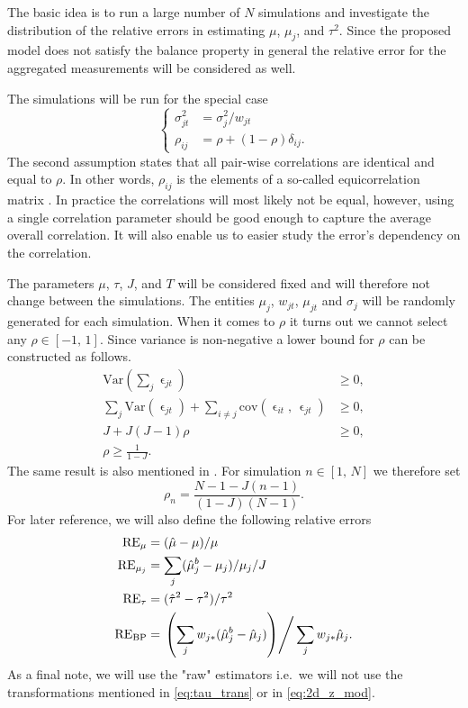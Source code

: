 \documentclass[11pt]{article}
\theoremstyle{definition}
\begin{document}
The basic idea is to run a large number of $N$ simulations and investigate the distribution of the relative errors in estimating $\mu$, $\mu_j$, and $\tau^2$. Since the proposed model does not satisfy the balance property in general the relative error for the aggregated measurements will be considered as well.

The simulations will be run for the special case 
\begin{equation*}
    \begin{cases}
        \sigma_{jt}^2 &= \sigma_j^2/w_{jt} \\
        \rho_{ij}&=\rho + (1-\rho)\delta_{ij}.
    \end{cases}
\end{equation*}
The second assumption states that all pair-wise correlations are identical and equal to $\rho$. In other words, $\rho_{ij}$ is the elements of a so-called equicorrelation matrix \cite{Oneill}. In practice the correlations will most likely not be equal, however, using a single correlation parameter should be good enough to capture the average overall correlation. It will also enable us to easier study the error's dependency on the correlation.

The parameters $\mu$, $\tau$, $J$, and $T$ will be considered fixed and will therefore not change between the simulations. The entities $\mu_j$, $w_{jt}$, $\mu_{jt}$ and $\sigma_j$ will be randomly generated for each simulation. When it comes to $\rho$ it turns out we cannot select any $\rho\in[-1,\, 1]$. Since variance is non-negative a lower bound for $\rho$ can be constructed as follows.
\begin{equation*}
    \begin{aligned}
    \text{Var}\left(\sum_j \upvarepsilon_{jt}\right) &\geq 0,\\
    \sum_j \text{Var}(\upvarepsilon_{jt}) + \sum_{i\neq j}\text{cov}(\upvarepsilon_{it},\, \upvarepsilon_{jt}) &\geq 0, \\
    J + J(J-1)\rho &\geq 0, \\
    \rho \geq \frac{1}{1-J}.
    \end{aligned}
\end{equation*}
The same result is also mentioned in \cite{Oneill}. For simulation $n\in[1,\, N]$ we therefore set
\begin{equation}\label{eq:rho_sim}
    \rho_n = \frac{N-1-J(n-1)}{(1-J)(N-1)}.
\end{equation}
For later reference, we will also define the following relative errors
\begin{align}
    \text{RE}_\mu &= (\hat\mu - \mu)/\mu \label{eq:RE_mu} \\
    \text{RE}_{\mu_j} &= \sum_j (\hat\mu_j^b - \mu_j)/\mu_j/J \label{eq:RE_muj} \\
    \text{RE}_\tau &= (\hat\tau^2 - \tau^2)/\tau^2 \label{eq:RE_tau}\\
    \text{RE}_\text{BP} &= \left.\left(\sum_j w_{j\ast}(\hat\mu_j^b -  \hat\mu_j)\right)\right/ \sum_j w_{j\ast}\hat\mu_j \label{eq:RE_bp}.
\end{align}
As a final note, we will use the "raw" estimators i.e.\ we will not use the transformations mentioned in \eqref{eq:tau_trans} or in \eqref{eq:2d_z_mod}.
\end{document}
